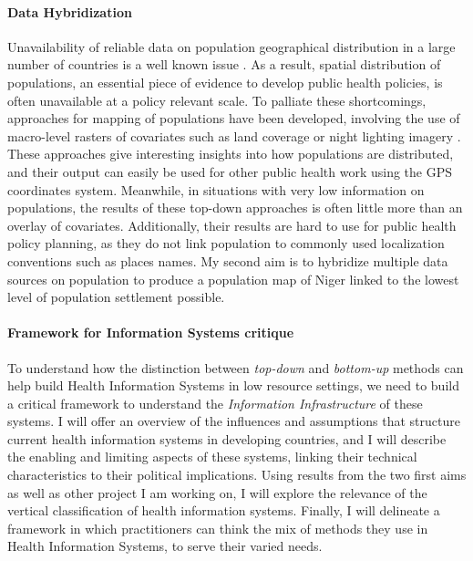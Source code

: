\paragraph{Data Hybridization} Unavailability of reliable data on population geographical distribution in a large number of countries is a well known issue \citep{mahapatra_civil_2007,mikkelsen_global_2015}. As a result, spatial distribution of populations, an essential piece of evidence to develop public health policies, is often unavailable at a policy relevant scale. To palliate these shortcomings, approaches for mapping of populations have been developed, involving the use of macro-level rasters of covariates such as land coverage or night lighting imagery  \citep{linard_population_2012,stevens_disaggregating_2015}. These approaches give interesting insights into how populations are distributed, and their output can easily be used for other public health work using the GPS coordinates system. Meanwhile, in situations with very low information on populations, the results of these top-down approaches is often little more than an overlay of covariates. Additionally, their results are hard to use for public health policy planning, as they do not link population to commonly used localization conventions such as places names. My second aim is to hybridize multiple data sources on population to produce a population map of Niger linked to the lowest level of population settlement possible.

\paragraph{Framework for Information Systems critique}  To understand how the distinction between \textit{top-down} and \textit{bottom-up} methods can help build  Health Information Systems in low resource settings, we need to build a critical framework to understand the \textit{Information Infrastructure} \citep{hunsinger_toward_2009} of these systems. I will offer an overview of the influences and assumptions that structure current health information systems in developing countries, and I will describe the enabling and limiting aspects of these systems, linking their technical characteristics to their political implications. Using results from the two first aims as well as other project I am working on, I will explore the relevance of the vertical classification of health information systems. Finally, I will delineate a framework in which practitioners can think the mix of methods they use in Health Information Systems, to serve their varied needs.


